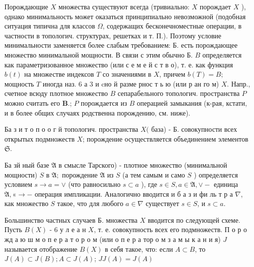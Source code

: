 \documentclass[10pt]{article}
\begin{document}
Порождающие $X$ множества существуют всегда (тривиально: $X$ порождает $X$ ), однако минимальность может оказаться принципиально невозможной (подобная ситуация типична для классов $\Omega$, содержащих бесконечноместные операции, в частности в топологич. структурах, решетках и т. П.). Поэтому условие минимальности заменяется более слабым требованием: Б. есть порождающее множество минимальной мощности. В связи с этим обычно Б. $B$ определяется как параметризованное множество (или с е м е й с т в о), т. е. как функция $b(t)$ на множестве индексов $T$ со значениями в $X$, причем $b(T)=B$; мощность $T$ иногда наз. 6 а 3 и cно й разме рнос т ь ю (или р ан го м) $X$. Напр., счетное всюду плотное множество $B$ сепарабельного топологич. пространства $P$ можно считать его $\mathbf{B}$.; $P$ порождается из $B$ операцией замыкания (к-рая, кстати, и в более общих случаях родственна порождению, см. ниже).



Ба з и т о п о о г й топологич. пространства $X($ база) - Б. совокупности всех открытых подмножеств $X$; порождение осуществляется объединением элементов $\mathfrak{S}$.



Ба зй ный базе $\mathfrak{A}$ в смысле Тарского) - плотное множество (минимальной мощности) $S$ в $\mathfrak{A} ;$ порождение $\mathfrak{A}$ из $S$ (а тем самым и само $S$ ) определяется условием $s \rightarrow a=\vee$ (что равносильно $s \subset a$ ), где $s \in S, a \in \mathfrak{A}, \vee-$ единица $\mathfrak{\mathfrak { A } ,} « \rightarrow-$ операция импликации. Аналогично вводится и б а з и фи ль т р а $\nabla$, как множество $S$ такое, что для любого $a \in \nabla$ существует $s \in S$, и $s \subset a$.



Большинство частных случаев Б. множества $X$ вводится по следующей схеме. Пусть $B(X)$ - 6 у л е а н $X$, т. е. совокупность всех его подмножеств. П о р о жд а ю ш м о п е р а т о р о м (или о п е р а тор о м з а м ы к а н и я) $J$ называется отображение $B(X)$ в себя такое, что: если $A \subset B$, то $J(A) \subset J(B) ; A \subset J(A)$; $J J(A)=J(A)$
\end{document}
